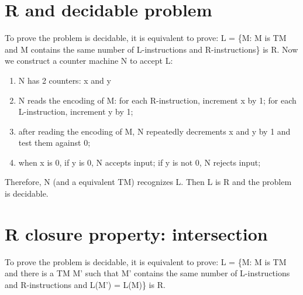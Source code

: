 \documentclass{article}
\begin{document}
\section{R and decidable problem}
To prove the problem is decidable, it is equivalent to prove:
L = \{M: M is TM and M contains the same number of L-instructions and
R-instructions\} is R. Now we construct a counter machine N to accept L:
\begin{enumerate}
  \item N has 2 counters: x and y
  \item N reads the encoding of M: for each R-instruction, increment x by 1; for
  each L-instruction, increment y by 1;
  \item after reading the encoding of M, N repeatedly decrements x and y by 1
  and test them against 0;
  \item when x is 0, if y is 0, N accepts input; if y is not 0, N rejects input;
\end{enumerate}
Therefore, N (and a equivalent TM) recognizes L. Then L is R and the problem is
decidable.

\section{R closure property: intersection}
To prove the problem is decidable, it is equivalent to prove:
L = \{M: M is TM and there is a TM M' such that M' contains the same number of
L-instructions and R-instructions and L(M') = L(M)\} is R.
\end{document}
